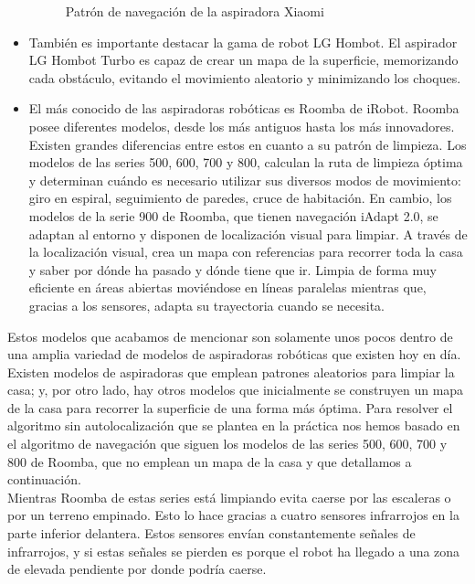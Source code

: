 \begin{itemize}
\begin{figure}[H]
\begin{center}
		\caption{Patrón de navegación de la aspiradora Xiaomi}
		\label{fig.Xiaomi}
		\end{center}
\end{figure}
\item También es importante destacar la gama de robot LG Hombot. El aspirador LG Hombot Turbo es capaz de crear un mapa de la superficie, memorizando cada obstáculo, evitando el movimiento aleatorio y minimizando los choques. 
\item El más conocido de las aspiradoras robóticas es Roomba de iRobot. Roomba posee diferentes modelos, desde los más antiguos hasta los más innovadores. Existen grandes diferencias entre estos en cuanto a su patrón de limpieza. Los modelos de las series 500, 600, 700 y 800, calculan la ruta de limpieza óptima y determinan cuándo es necesario utilizar sus diversos modos de movimiento: giro en espiral, seguimiento de paredes, cruce de habitación. En cambio, los modelos de la serie 900 de Roomba, que tienen navegación iAdapt 2.0, se adaptan al entorno y disponen de localización visual para limpiar. A través de la localización visual, crea un mapa con referencias para recorrer toda la casa y saber por dónde ha pasado y dónde tiene que ir. Limpia de forma muy eficiente en áreas abiertas moviéndose en líneas paralelas mientras que, gracias a los sensores, adapta su trayectoria cuando se necesita.
\end{itemize}

Estos modelos que acabamos de mencionar son solamente unos pocos dentro de una amplia variedad de modelos de aspiradoras robóticas que existen hoy en día. Existen modelos de aspiradoras que emplean patrones aleatorios para limpiar la casa; y, por otro lado, hay otros modelos que inicialmente se construyen un mapa de la casa para recorrer la superficie de una forma más óptima. Para resolver el algoritmo sin autolocalización que se plantea en la práctica nos hemos basado en el algoritmo de navegación que siguen los modelos de las series 500, 600, 700 y 800 de Roomba, que no emplean un mapa de la casa y que detallamos a continuación.\\

Mientras Roomba de estas series está limpiando evita caerse por las escaleras o por un terreno empinado. Esto lo hace gracias a cuatro sensores infrarrojos en la parte inferior delantera. Estos sensores envían constantemente señales de infrarrojos, y si estas señales se pierden es porque el robot ha llegado a una zona de elevada pendiente por donde podría caerse.\\


